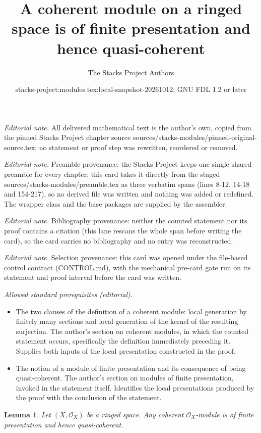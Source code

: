\documentclass[10pt,a4paper]{amsart}
\title{A coherent module on a ringed space is of finite presentation and hence quasi-coherent}
\author{The Stacks Project Authors}
\date{stacks-project:modules.tex:local-snapshot-20261012; GNU FDL 1.2 or later}
\theoremstyle{plain}
\newtheorem{lemma}[subsection]{Lemma}
\theoremstyle{definition}
\theoremstyle{remark}
\numberwithin{equation}{subsection}
\begin{document}
\maketitle
\noindent\textit{Editorial note.} All delivered mathematical text is the author's own, copied from the pinned Stacks Project chapter source sources/stacks-modules/pinned-original-source.tex; no statement or proof step was rewritten, reordered or removed.\par\medskip
\noindent\textit{Editorial note.} Preamble provenance: the Stacks Project keeps one single shared preamble for every chapter; this card takes it directly from the staged sources/stacks-modules/preamble.tex as three verbatim spans (lines 8-12, 14-18 and 154-217), so no derived file was written and nothing was added or redefined. The wrapper class and the base packages are supplied by the assembler.\par\medskip
\noindent\textit{Editorial note.} Bibliography provenance: neither the counted statement nor its proof contains a citation (this lane rescans the whole span before writing the card), so the card carries no bibliography and no entry was reconstructed.\par\medskip
\noindent\textit{Editorial note.} Selection provenance: this card was opened under the file-based control contract (CONTROL.md), with the mechanical pre-card gate run on its statement and proof interval before the card was written.\par\medskip
\noindent\textit{Allowed standard prerequisites (editorial).}\begin{itemize}
\item The two clauses of the definition of a coherent module: local generation by finitely many sections and local generation of the kernel of the resulting surjection. The author's section on coherent modules, in which the counted statement occurs, specifically the definition immediately preceding it. Supplies both inputs of the local presentation constructed in the proof.
\item The notion of a module of finite presentation and its consequence of being quasi-coherent. The author's section on modules of finite presentation, invoked in the statement itself. Identifies the local presentations produced by the proof with the conclusion of the statement.
\end{itemize}\medskip
\begin{lemma}
\label{lemma-coherent-finite-presentation}
Let $(X, \mathcal{O}_X)$ be a ringed space.
Any coherent $\mathcal{O}_X$-module is of finite presentation
and hence quasi-coherent.
\end{lemma}
\end{document}
